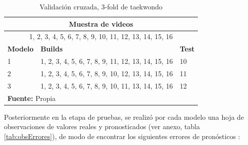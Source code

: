 \begin{table}[H]
\begin{center}
\caption{Validaci\'on cruzada, 3-fold de taekwondo}
\label{tab:KfoldTaekwondo}
\begin{tabular}{|l|l|l|}
\hline
\multicolumn{3}{|c|}{\textbf{Muestra de videos}} \\ \hline
\multicolumn{3}{|c|}{1, 2, 3, 4, 5, 6, 7, 8, 9, 10, 11, 12, 13, 14, 15, 16} \\ \hline
\textbf{Modelo} & \textbf{Builds} & \textbf{Test} \\ \hline
1 & 1, 2, 3, 4, 5, 6, 7, 8, 9, 11, 12, 13, 14, 15, 16 & 10 \\ \hline
2 & 1, 2, 3, 4, 5, 6, 7, 8, 9, 10, 12, 13, 14, 15, 16 & 11 \\ \hline
3 & 1, 2, 3, 4, 5, 6, 7, 8, 9, 10, 11, 13, 14, 15, 16 & 12 \\ \hline
\multicolumn{3}{l}{\textbf{Fuente:} Propia}
\end{tabular}
\end{center}
\end{table}
Posteriormente en la etapa de pruebas, se realiz\'o  por cada modelo una hoja de observaciones de valores reales y pronosticados (ver anexo, tabla \ref{tab:obsErrores}), de modo de encontrar los siguientes errores de pron\'osticos \cite{erroresPronostico}:
